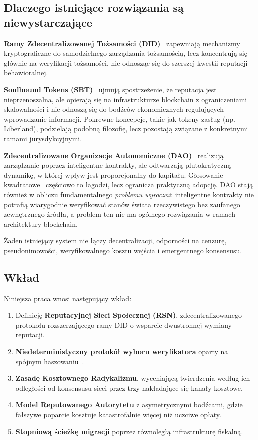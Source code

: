 \documentclass[11pt,a4paper,twocolumn]{article}
\begin{document}
\subsection{Dlaczego istniejące rozwiązania są niewystarczające}

\textbf{Ramy Zdecentralizowanej Tożsamości (DID)}~\cite{did2022} zapewniają mechanizmy kryptograficzne do samodzielnego zarządzania tożsamością, lecz koncentrują się głównie na weryfikacji tożsamości, nie odnosząc się do szerszej kwestii reputacji behawioralnej.

\textbf{Soulbound Tokens (SBT)}~\cite{weyl2022} ujmują spostrzeżenie, że reputacja jest nieprzenoszalna, ale opierają się na infrastrukturze blockchain z ograniczeniami skalowalności i nie odnoszą się do bodźców ekonomicznych regulujących wprowadzanie informacji. Pokrewne koncepcje, takie jak tokeny zasług (np. Liberland), podzielają podobną filozofię, lecz pozostają związane z konkretnymi ramami jurysdykcyjnymi.

\textbf{Zdecentralizowane Organizacje Autonomiczne (DAO)}~\cite{buterin2014} realizują zarządzanie poprzez inteligentne kontrakty, ale odtwarzają plutokratyczną dynamikę, w której wpływ jest proporcjonalny do kapitału. Głosowanie kwadratowe~\cite{buterin2019} częściowo to łagodzi, lecz ogranicza praktyczną adopcję. DAO stają również w obliczu fundamentalnego \emph{problemu wyroczni}: inteligentne kontrakty nie potrafią wiarygodnie weryfikować stanów świata rzeczywistego bez zaufanego zewnętrznego źródła, a problem ten nie ma ogólnego rozwiązania w ramach architektury blockchain.

Żaden istniejący system nie łączy decentralizacji, odporności na cenzurę, pseudonimowości, weryfikowalnego kosztu wejścia i emergentnego konsensusu.

\subsection{Wkład}

Niniejsza praca wnosi następujący wkład:
\begin{enumerate}[nosep]
\item Definicję \textbf{Reputacyjnej Sieci Społecznej (RSN)}, zdecentralizowanego protokołu rozszerzającego ramy DID o wsparcie dwustronnej wymiany reputacji.
\item \textbf{Niedeterministyczny protokół wyboru weryfikatora} oparty na spójnym haszowaniu~\cite{karger1997}.
\item \textbf{Zasadę Kosztownego Radykalizmu}, wyceniającą twierdzenia według ich odległości od konsensusu sieci przez trzy nakładające się kanały kosztowe.
\item \textbf{Model Reputowanego Autorytetu} z asymetrycznymi bodźcami, gdzie fałszywe poparcie kosztuje katastrofalnie więcej niż uczciwe opłaty.
\item \textbf{Stopniową ścieżkę migracji} poprzez równoległą infrastrukturę fiskalną.
\end{enumerate}
\end{document}
